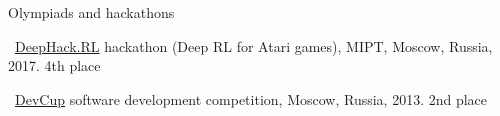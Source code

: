 \documentclass{resume} %
\begin{document}

\begin{rSection}{Olympiads and hackathons}
\item \faExternalLink~\href{http://web.archive.org/web/20170224094223/http://rl.deephack.me/}{DeepHack.RL} hackathon (Deep RL for Atari games), MIPT, Moscow, Russia, 2017. 4th place
\item \faExternalLink~\href{https://vk.com/devcup}{DevCup} software development competition, Moscow, Russia, 2013. 2nd place
\end{rSection}
\end{document}
